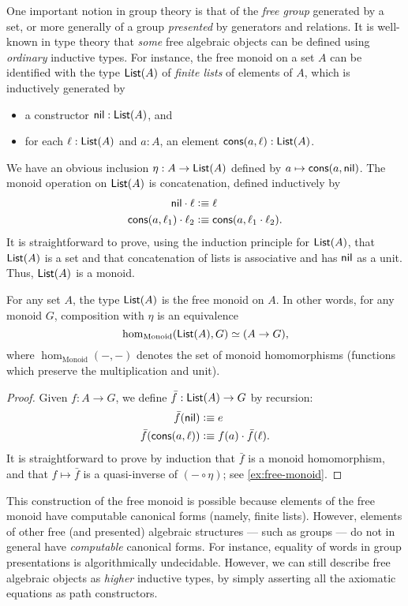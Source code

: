 One important notion in group theory is that of the \emph{free group} generated by a set, or more generally of a group \emph{presented} by generators and relations.
It is well-known in type theory that \emph{some} free algebraic objects can be defined using \emph{ordinary} inductive types.
For instance, the free monoid on a set $A$ can be identified with the type $\mathsf{List}(A)$ of \emph{finite lists} of elements of $A$, which is inductively generated by
\begin{itemize}
\item a constructor $\mathsf{nil}:\mathsf{List}(A)$, and
\item for each $\ell:\mathsf{List}(A)$ and $a:A$, an element $\mathsf{cons}(a,\ell):\mathsf{List}(A)$.
\end{itemize}
We have an obvious inclusion $\eta : A\to \mathsf{List}(A)$ defined by $a\mapsto \mathsf{cons}(a,\mathsf{nil})$.
The monoid operation on $\mathsf{List}(A)$ is concatenation, defined inductively by
\begin{align*}
  \mathsf{nil} \cdot \ell &\vcentcolon\equiv \ell\\
  \mathsf{cons} (a,\ell_1) \cdot \ell_2 &\vcentcolon\equiv \mathsf{cons}(a, \ell_1\cdot\ell_2).
\end{align*}
It is straightforward to prove, using the induction principle for $\mathsf{List}(A)$, that $\mathsf{List}(A)$ is a set and that concatenation of lists is associative and has $\mathsf{nil}$ as a unit.
Thus, $\mathsf{List}(A)$ is a monoid.

\begin{lem}\label{thm:free-monoid}
  For any set $A$, the type $\mathsf{List}(A)$ is the free monoid on $A$.
  In other words, for any monoid $G$, composition with $\eta$ is an equivalence
  \[ \hom_{\mathrm{Monoid}}(\mathsf{List}(A),G) \simeq (A\to G), \]
  where $\hom_{\mathrm{Monoid}}(-,-)$ denotes the set of monoid homomorphisms (functions which preserve the multiplication and unit).
\end{lem}
\begin{proof}
  Given $f:A\to G$, we define $\bar{f}:\mathsf{List}(A) \to G$ by recursion:
  \begin{align*}
    \bar{f}(\mathsf{nil}) &\vcentcolon\equiv e\\
    \bar{f}(\mathsf{cons}(a,\ell)) &\vcentcolon\equiv f(a) \cdot \bar{f}(\ell).
  \end{align*}
  It is straightforward to prove by induction that $\bar{f}$ is a monoid homomorphism, and that $f\mapsto \bar f$ is a quasi-inverse of $(-\circ \eta)$; see \autoref{ex:free-monoid}.
\end{proof}

This construction of the free monoid is possible because elements of the free monoid have computable canonical forms (namely, finite lists).
However, elements of other free (and presented) algebraic structures --- such as groups --- do not in general have \emph{computable} canonical forms.
For instance, equality of words in group presentations is algorithmically undecidable.
However, we can still describe free algebraic objects as \emph{higher} inductive types, by simply asserting all the axiomatic equations as path constructors.

